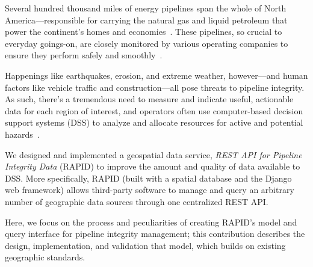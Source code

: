 Several hundred thousand miles of energy pipelines span the whole of North America---responsible for carrying the natural gas and liquid petroleum that power the continent's homes and economies~\cite{PHMSA}. These pipelines, so crucial to everyday goings-on, are closely monitored by various operating companies to ensure they perform safely and smoothly~\cite{PHMSA2013}. 

Happenings like earthquakes, erosion, and extreme weather, however---and human factors like vehicle traffic and construction---all pose threats to pipeline integrity. As such, there's a tremendous need to measure and indicate useful, actionable data for each region of interest, and operators often use computer-based decision support systems (DSS) to analyze and allocate resources for active and potential hazards~\cite{PHMSA2013,MichaelBakerJr.2008,Chastain,Dunning2013}.

We designed and implemented a geospatial data service, \textit{REST API for Pipeline Integrity Data} (RAPID) to improve the amount and quality of data available to DSS. More specifically, RAPID (built with a spatial database and the Django web framework) allows third-party software to manage and query an arbitrary number of geographic data sources through one centralized REST API.

Here, we focus on the process and peculiarities of creating RAPID's model and query interface for pipeline integrity management; this contribution describes the design, implementation, and validation that model, which builds on existing geographic standards.